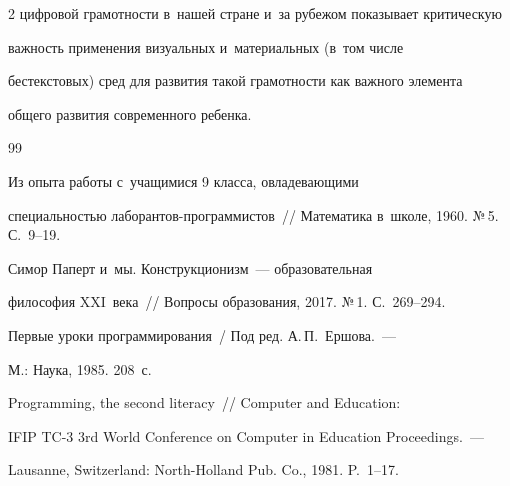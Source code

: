 \begin{multicols}{2}
цифровой грамотности в~нашей стране и~за рубежом показывает критическую 


важ\-ность применения визуальных и~материальных (в~том чис\-ле 


бестекстовых) сред для развития такой гра\-мот\-ности как важного элемента 


общего развития современного ребенка.





\vspace*{-6pt}





{\small\frenchspacing


 {%




 \begin{thebibliography}{99}





\vspace*{-2pt}







   Из опыта работы с~учащимися 9 класса, овладевающими 


специальностью лаборантов-про\-грам\-ми\-стов~// Математика в~школе, 1960. №\,5. С.~9--19.




   Симор Паперт и~мы. Конструкционизм~--- образовательная 


философия XXI~века~// Вопросы образования, 2017. №\,1. С.~269--294. 




   Первые уроки программирования~/ Под ред. А.\,П.~Ершова.~--- 


М.: Наука, 1985. 208~с. %




 Programming, the second literacy~// Computer and Education: 


IFIP TC-3 3rd World Conference on Computer in Education Proceedings.~--- 


Lausanne, Switzerland: North-Holland Pub. Co., 1981. P.~1--17.





\end{thebibliography}}}
\end{multicols}
